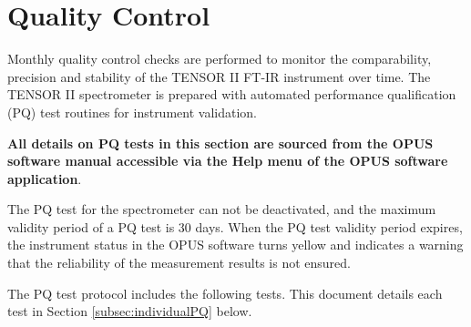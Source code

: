 \section{Quality Control}
\label{sec:QC}


Monthly quality control checks are performed to monitor the comparability, precision and stability of the TENSOR II FT-IR instrument over time. The TENSOR II spectrometer is prepared with automated performance qualification (PQ) test routines for instrument validation\cite{Bruker1}. 

\textbf{All details on PQ tests in this section are sourced from the OPUS software manual accessible via the Help menu of the OPUS software application}.

The PQ test for the spectrometer can not be deactivated, and the maximum validity period of a PQ test is 30 days. When the PQ test validity period expires, the instrument status in the OPUS software turns yellow and indicates a warning that the reliability of the measurement results is not ensured.

The PQ test protocol includes the following tests. This document details each test in Section \ref{subsec:individualPQ} below.

